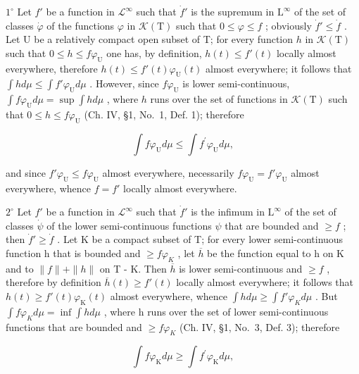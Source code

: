 \(1^{\circ}\) Let \(f'\) be a function in \(\mathcal{L}^{\infty}\) such that \(\dot{f}'\) is the supremum in \(\mathrm{L}^{\infty}\) of the set of classes \(\dot{\varphi}\) of the functions \(\varphi\) in \(\mathcal{K}(\mathrm{T})\) such that \(0 \leqslant \varphi \leqslant f\) ; obviously \(\dot{f}' \leqslant \dot{f}\) . Let U be a relatively compact open subset of T; for every function \(h\) in \(\mathcal{K}(\mathrm{T})\) such that \(0 \leqslant h \leqslant f\varphi_{\mathrm{U}}\) one has, by definition, \(h(t) \leqslant f'(t)\) locally almost everywhere, therefore \(h(t) \leqslant f'(t)\varphi_{\mathrm{U}}(t)\) almost everywhere; it follows that \(\int h d\mu \leqslant \int f'\varphi_{\mathrm{U}} d\mu\) . However, since \(f\varphi_{\mathrm{U}}\) is lower semi-continuous, \(\int f\varphi_{\mathrm{U}} d\mu = \sup \int h d\mu\) , where \(h\) runs over the set of functions in \(\mathcal{K}(\mathrm{T})\) such that \(0 \leqslant h \leqslant f\varphi_{\mathrm{U}}\) (Ch. IV, §1, No.~1, Def. 1); therefore

\[
\int f \varphi_ {\mathrm{U}} d \mu \leqslant \int f ^ {\prime} \varphi_ {\mathrm{U}} d \mu ,
\]

and since \(f' \varphi_{\mathrm{U}} \leqslant f \varphi_{\mathrm{U}}\) almost everywhere, necessarily \(f \varphi_{\mathrm{U}} = f' \varphi_{\mathrm{U}}\) almost everywhere, whence \(f = f'\) locally almost everywhere.

\(2^{\circ}\) Let \(f'\) be a function in \(\mathcal{L}^{\infty}\) such that \(\dot{f}'\) is the infimum in \(\mathrm{L}^{\infty}\) of the set of classes \(\dot{\psi}\) of the lower semi-continuous functions \(\psi\) that are bounded and \(\geqslant f\) ; then \(\dot{f}' \geqslant \dot{f}\) . Let K be a compact subset of T; for every lower semi-continuous function h that is bounded and \(\geqslant f\varphi_{K}\) , let \(\overline{h}\) be the function equal to h on K and to \(\|f\| + \|h\|\) on T - K. Then \(\overline{h}\) is lower semi-continuous and \(\geqslant f\) , therefore by definition \(\overline{h}(t) \geqslant f'(t)\) locally almost everywhere; it follows that \(h(t) \geqslant f'(t)\varphi_{\mathrm{K}}(t)\) almost everywhere, whence \(\int h d\mu \geqslant \int f'\varphi_{K} d\mu\) . But \(\int f\varphi_{K} d\mu = \inf \int h d\mu\) , where h runs over the set of lower semi-continuous functions that are bounded and \(\geqslant f\varphi_{K}\) (Ch. IV, §1, No.~3, Def. 3); therefore

\[
\int f \varphi_ {\mathrm{K}} d \mu \geqslant \int f ^ {\prime} \varphi_ {\mathrm{K}} d \mu ,
\]

